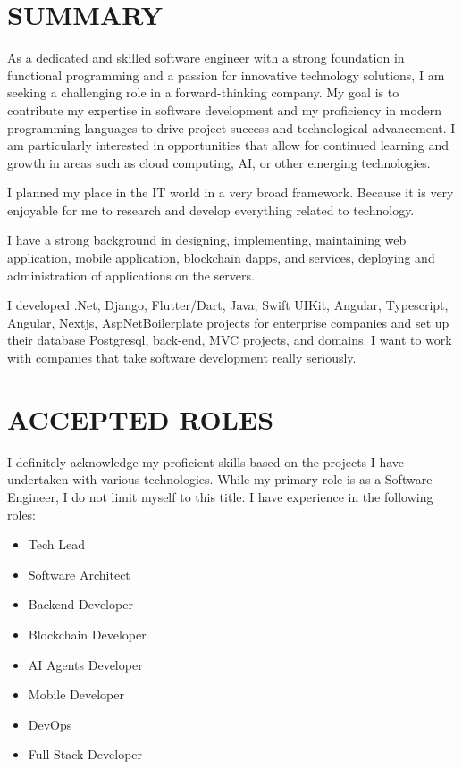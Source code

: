 \documentclass[line,margin]{res}
\begin{document}
\address{emre.yildiz.dev@hotmail.com}
\address{\href{https://linkedin.com/in/emre-yildiz-297ab0242}{ Linkedin}} 


 
\begin{resume}
 
\noindent\hrulefill
\section{SUMMARY}  As a dedicated and skilled software engineer with a strong foundation in functional programming and a passion for innovative technology solutions, I am seeking a challenging role in a forward-thinking company. My goal is to contribute my expertise in software development and my proficiency in modern programming languages to drive project success and technological advancement. I am particularly interested in opportunities that allow for continued learning and growth in areas such as cloud computing, AI, or other emerging technologies.
                
I planned my place in the IT world in a very broad framework. Because it is very enjoyable for me to research and develop everything related to technology.

I have a strong background in designing, implementing, maintaining web application, mobile application, blockchain dapps, and services, deploying and administration of applications  on the servers.

I developed .Net, Django, Flutter/Dart, Java, Swift UIKit, Angular, Typescript, Angular, Nextjs, AspNetBoilerplate projects for enterprise companies and set up their database Postgresql, back-end, MVC projects, and domains.
I want to work with companies that take software development really seriously.

\noindent\hrulefill

\section{\textbf{ACCEPTED ROLES}} I definitely acknowledge my proficient skills based on the projects I have undertaken with various technologies. While my primary role is as a Software Engineer, I do not limit myself to this title. I have experience in the following roles:
\begin{itemize}
\item Tech Lead
\item Software Architect
\item Backend Developer
\item Blockchain Developer
\item AI Agents Developer
\item Mobile Developer
\item DevOps
\item Full Stack Developer
\end{itemize}


\end{resume}
\end{document}
